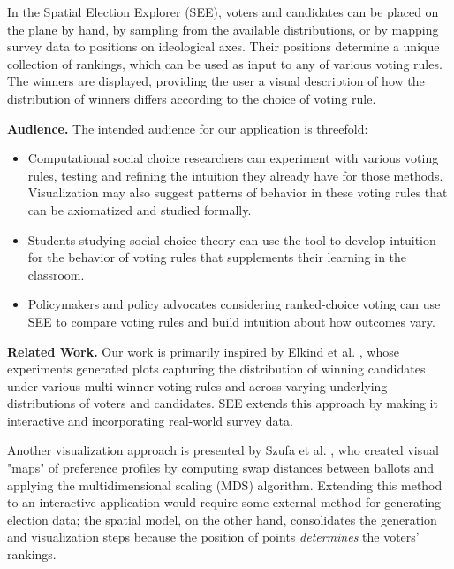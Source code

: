 In the Spatial Election Explorer (SEE),
voters and candidates can be placed on the plane by hand,
by sampling from the available distributions,
or by mapping survey data to positions on ideological axes.
Their positions determine a unique collection of rankings,
which can be used as input to any of various voting rules.
The winners are displayed, providing the user a visual description
of how the distribution of winners differs according to the choice of voting rule.

\textbf{Audience.}
The intended audience for our application is threefold:
\begin{itemize}[itemsep=0.2em]
\item[1.] Computational social choice researchers can experiment with various voting rules,
testing and refining the intuition they already have for those methods.
Visualization may also suggest patterns of behavior in these voting rules that can
be axiomatized and studied formally.
%
\item[2.] Students studying social choice theory can use the tool to develop intuition
for the behavior of voting rules that supplements their learning in the
classroom.
%
\item[3.] Policymakers and policy advocates considering ranked-choice voting
   can use SEE to compare voting rules and build intuition about how outcomes vary.
\end{itemize}

\textbf{Related Work.}
Our work is primarily inspired by Elkind et al. \cite{elkind},
whose experiments generated plots capturing the distribution of winning candidates
under various multi-winner voting rules
and across varying underlying distributions of voters and candidates.
SEE extends this approach by making it interactive and incorporating real-world survey data.

Another visualization approach is presented by
Szufa et al. \cite{dap}, who created visual "maps" of preference profiles
by computing swap distances between ballots and applying the
multidimensional scaling (MDS) algorithm.
Extending this method to an interactive application would require
some external method for generating election data;
the spatial model, on the other hand, consolidates the generation and visualization steps
because the position of points \textit{determines} the voters' rankings.
